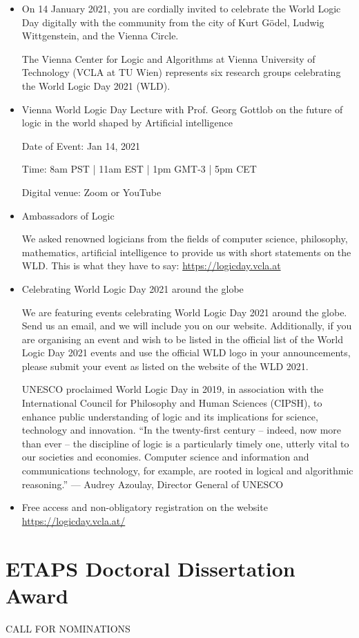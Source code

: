 \documentclass{article}
\begin{document}
\begin{itemize}\item  On 14 January 2021, you are cordially invited to celebrate the World Logic Day digitally with the community from the city of Kurt Gödel, Ludwig Wittgenstein, and the Vienna Circle. 
 
  The Vienna Center for Logic and Algorithms at Vienna University of Technology (VCLA at TU Wien) represents six research groups celebrating the World Logic Day 2021 (WLD). 
 
\item  Vienna World Logic Day Lecture with Prof. Georg Gottlob on the future of logic in the world shaped by Artificial intelligence 
 
Date of Event: Jan 14, 2021 
 
  Time: 8am PST | 11am EST | 1pm GMT-3 | 5pm CET  
 
  Digital venue: Zoom or YouTube 
 
\item  Ambassadors of Logic 
 
  We asked renowned logicians from the fields of computer science, philosophy, mathematics, artificial intelligence to provide us with short statements on the WLD.  This is what they have to say: \href{https://logicday.vcla.at}{https://logicday.vcla.at}  
 
\item  Celebrating World Logic Day 2021 around the globe 
 
  We are featuring events celebrating World Logic Day 2021 around the globe. Send us an email, and we will include you on our website. Additionally, if you are organising an event and wish to be listed in the official list of the World Logic Day 2021 events and use the official WLD logo in your announcements, please submit your event as listed on the website of the WLD 2021.  
 
  UNESCO proclaimed World Logic Day in 2019, in association with the International Council for Philosophy and Human Sciences (CIPSH), to enhance public understanding of logic and its implications for science, technology and innovation. ``In the twenty-first century – indeed, now more than ever – the discipline of logic is a particularly timely one, utterly vital to our societies and economies. Computer science and information and communications technology, for example, are rooted in logical and algorithmic reasoning.'' — Audrey Azoulay, Director General of UNESCO 
 
\item  Free access and non-obligatory registration on the website \href{https://logicday.vcla.at/}{https://logicday.vcla.at/} 
 
\end{itemize}\section{ETAPS Doctoral Dissertation Award}\label{ETAPSDoctoralDissertationAward}CALL FOR NOMINATIONS 
\end{document}
